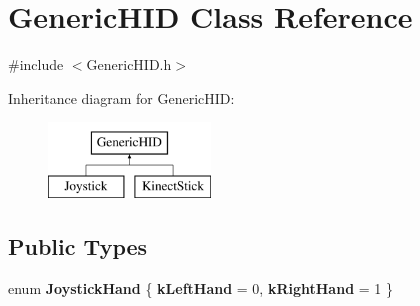\hypertarget{classGenericHID}{
\section{GenericHID Class Reference}
\label{classGenericHID}
}


{\ttfamily \#include $<$GenericHID.h$>$}

Inheritance diagram for GenericHID:\begin{figure}[H]
\begin{center}
\leavevmode
\includegraphics[height=2.000000cm]{classGenericHID}
\end{center}
\end{figure}
\subsection*{Public Types}
\begin{DoxyCompactItemize}
\item 
enum {\bfseries JoystickHand} \{ {\bfseries kLeftHand} =  0, 
{\bfseries kRightHand} =  1
 \}
\end{DoxyCompactItemize}

